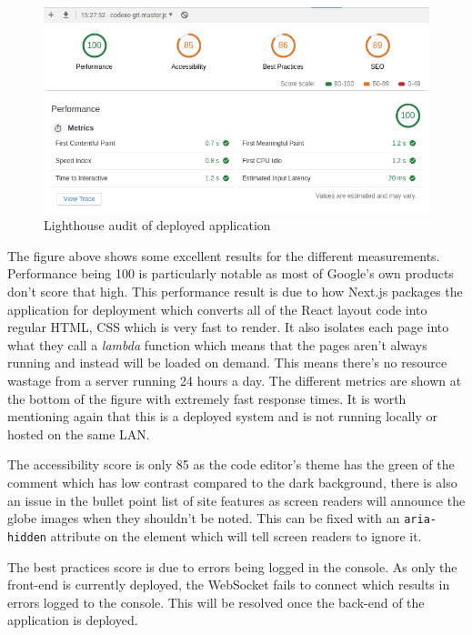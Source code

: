 \begin{figure}[h!]
    \centering
    \includegraphics[scale=0.5]{res/lighthouse_audit_deployed.png}
    \caption{Lighthouse audit of deployed application}
    \label{deployed-lighthouse}
\end{figure}

The figure above shows some excellent results for the different measurements. Performance being 100 is particularly notable as most of Google's own products don't score that high. This performance result is due to how Next.js packages the application for deployment which converts all of the React layout code into regular HTML, CSS which is very fast to render. It also isolates each page into what they call a \textit{lambda} function which means that the pages aren't always running and instead will be loaded on demand. This means there's no resource wastage from a server running 24 hours a day. The different metrics are shown at the bottom of the figure with extremely fast response times. It is worth mentioning again that this is a deployed system and is not running locally or hosted on the same LAN.

The accessibility score is only 85 as the code editor's theme has the green of the comment which has low contrast compared to the dark background, there is also an issue in the bullet point list of site features as screen readers will announce the globe images when they shouldn't be noted. This can be fixed with an \texttt{aria-hidden} attribute on the element which will tell screen readers to ignore it. 

The best practices score is due to errors being logged in the console. As only the front-end is currently deployed, the WebSocket fails to connect which results in errors logged to the console. This will be resolved once the back-end of the application is deployed. 

